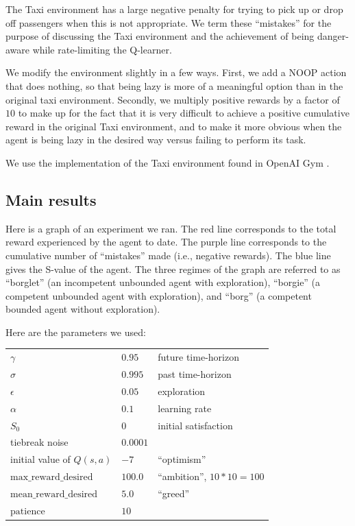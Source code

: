 \documentclass{article}
\begin{document}
The Taxi environment has a large negative penalty for trying to pick up or drop
off passengers when this is not appropriate. We term these ``mistakes'' for the
purpose of discussing the Taxi environment and the achievement of being
danger-aware while rate-limiting the Q-learner.

We modify the environment slightly in a few ways. First, we add a NOOP action
that does nothing, so that being lazy is more of a meaningful option than in
the original taxi environment. Secondly, we multiply positive rewards by a
factor of $10$ to make up for the fact that it is very difficult to achieve a
positive cumulative reward in the original Taxi environment, and to make it
more obvious when the agent is being lazy in the desired way versus failing to
perform its task.

We use the implementation of the Taxi environment found in OpenAI Gym
\cite{openai-gym}.

\subsection{Main results}

Here is a graph of an experiment we ran. The red line corresponds to the total
reward experienced by the agent to date. The purple line corresponds to the
cumulative number of ``mistakes'' made (i.e., negative rewards). The blue line
gives the S-value of the agent. The three regimes of the graph are referred to
as ``borglet'' (an incompetent unbounded agent with exploration), ``borgie'' (a
competent unbounded agent with exploration), and ``borg'' (a competent bounded
agent without exploration).

Here are the parameters we used:

\begin{tabular}{|l|l|l|}
\hline
$\gamma$ & $0.95$ & future time-horizon\\
$\sigma$ & $0.995$ & past time-horizon\\
$\epsilon$ & $0.05$ & exploration\\
$\alpha$ & $0.1$ & learning rate\\
$S_0$ & $0$ & initial satisfaction\\
tiebreak noise & $0.0001$ & \\
initial value of $Q(s,a)$ & $-7$ &  ``optimism''\\
$\mathrm{max\_reward\_desired}$ & $100.0$ &  ``ambition'', $10 * 10 = 100$ \\
$\mathrm{mean\_reward\_desired}$ & $5.0$ & ``greed'' \\
$\mathrm{patience}$ & $10$ & \\
\hline
\end{tabular}
\end{document}
